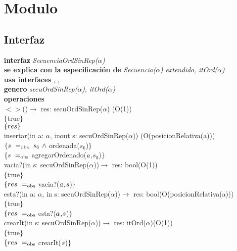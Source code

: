 \section*{Modulo }

\subsection*{Interfaz}
\textbf{interfaz} \textit{SecuenciaOrdSinRep($\alpha$)}\\
\textbf{se explica con la especificaci\'on de} \textit{Secuencia($\alpha$) extendido, itOrd($\alpha$)}\\
\textbf{usa interfaces} , \nombretad{$\alpha$}, \\
\textbf{genero} \textit{secuOrdSinRep($\alpha$), itOrd($\alpha$)}\\

\textbf{operaciones}\\

$<>$()$\longrightarrow$ res: secuOrdSinRep($\alpha$) \hfill (O(1))\\
$\{$true$\}$\\
$\{{res}\}$\\

insertar(in a: $\alpha$, inout s: secuOrdSinRep($\alpha$)) \hfill (O(posicionRelativa(a)))\\
$\{\sombreritoWide{s}\ \igobs\ s_0\ \wedge$ ordenada($s_0$)$\}$\\
$\{{s}\ =_{\mathrm{obs}}$ agregarOrdenado(${a}$,$s_0$)$\}$\\

vacia?(in s: secuOrdSinRep($\alpha$))$\longrightarrow$ res: bool\hfill (O(1))\\
$\{$true$\}$\\
$\{{res}\ =_{\mathrm{obs}}$ vacia?(${a}$,${s}$)$\}$\\

esta?(in a: $\alpha$, in s: secuOrdSinRep($\alpha$))$\longrightarrow$ res: bool\hfill (O(posicionRelativa(a)))\\
$\{$true$\}$\\
$\{{res}\ =_{\mathrm{obs}}$ esta?(${a}$,${s}$)$\}$\\

crearIt(in s: secuOrdSinRep($\alpha$))$\longrightarrow$ res: itOrd($\alpha$)\hfill (O(1))\\
$\{$true$\}$\\
$\{{res}\ =_{\mathrm{obs}}$ crearIt(${s}$)$\}$\\

